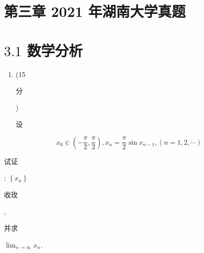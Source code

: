 \documentclass[10pt]{article}
\begin{document}
\section{第三章 2021 年湖南大学真题}
\section{$3.1$ 数学分析}
\begin{enumerate}
  \item (15 \begin{CJK}{UTF8}{mj}分\end{CJK}) \begin{CJK}{UTF8}{mj}设\end{CJK}
\end{enumerate}
$$
x_{0} \in\left(-\frac{\pi}{2}, \frac{\pi}{2}\right), x_{n}=\frac{\pi}{2} \sin x_{n-1},(n=1,2, \cdots)
$$
\begin{CJK}{UTF8}{mj}试证\end{CJK}: $\left\{x_{n}\right\}$ \begin{CJK}{UTF8}{mj}收玫\end{CJK}, \begin{CJK}{UTF8}{mj}并求\end{CJK} $\lim _{n \rightarrow \infty} x_{n}$.
\end{document}
